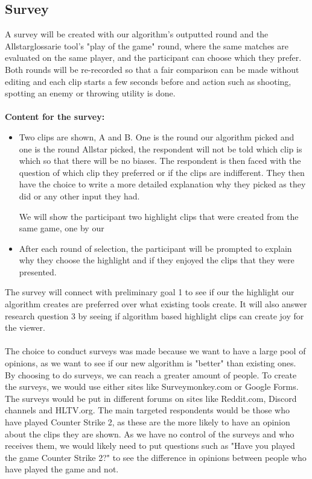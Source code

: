\documentclass[a4paper,twoside]{bth}
\begin{document}
\subsection{Survey}
\label{sec:survey}
A survey will be created with our algorithm's outputted round and the Allstar{glossarie} tool's "play of the game" round, where the same matches are evaluated on the same player, and the participant can choose which they prefer. Both rounds will be re-recorded so that a fair comparison can be made without editing and each clip starts a few seconds before and action such as shooting, spotting an enemy or throwing utility is done. \\\\
\textbf {Content for the survey:}
\begin{itemize}
    \item Two clips are shown, A and B. One is the round our algorithm picked and one is the round Allstar picked, the respondent will not be told which clip is which so that there will be no biases. The respondent is then faced with the question of which clip they preferred or if the clips are indifferent. They then have the choice to write a more detailed explanation why they picked as they did or any other input they had.
    
    We will show the participant two highlight clips that were created from the same game, one by our 
    \item After each round of selection, the participant will be prompted to explain why they choose the highlight and if they enjoyed the clips that they were presented.  
\end{itemize}
The survey will connect with preliminary goal 1 to see if our the highlight our algorithm creates are preferred over what existing tools create. It will also answer research question 3 by seeing if algorithm based highlight clips can create joy for the viewer.\\\\
The choice to conduct surveys was made because we want to have a large pool of opinions, as we want to see if our new algorithm is "better" than existing ones. By choosing to do surveys, we can reach a greater amount of people. To create the surveys, we would use either sites like Surveymonkey.com or Google Forms. The surveys would be put in different forums on sites like Reddit.com, Discord channels and HLTV.org. The main targeted respondents would be those who have played Counter Strike 2, as these are the more likely to have an opinion about the clips they are shown. As we have no control of the surveys and who receives them, we would likely need to put questions such as "Have you played the game Counter Strike 2?" to see the difference in opinions between people who have played the game and not.\\\\
\end{document}
